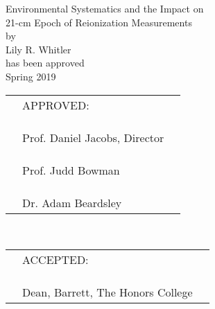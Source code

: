 \documentclass[12pt]{article}
\begin{document}
\doublespacing
\begin{center}
Environmental Systematics and the Impact on \\ 21-cm Epoch of Reionization Measurements \\
by \\
Lily R. Whitler \\
has been approved \\
Spring 2019 \vspace{0.1\textheight}

\begingroup
\renewcommand{\arraystretch}{0.7}
\begin{tabular}{p{1cm}p{3.5in}p{1cm}}
	& \centering APPROVED: & \\
	& & \\ & & \\
	& \hrulefill & \\
	& \hfill Prof. Daniel Jacobs, Director & \\
	& & \\ & & \\
	& \hrulefill & \\
	& \hfill Prof. Judd Bowman & \\
	& & \\ & & \\
	& \hrulefill & \\
	& \hfill Dr. Adam Beardsley &
\end{tabular} \vspace{0.075\textheight} \\
\begin{tabular}{p{1cm}p{3.5in}p{1cm}}
	& \centering ACCEPTED: & \\
	& & \\ & & \\
	& \hrulefill & \\
	& \hfill Dean, Barrett, The Honors College &
\end{tabular}
\endgroup
\end{center}
\thispagestyle{empty}
\newpage
{}
\end{document}

